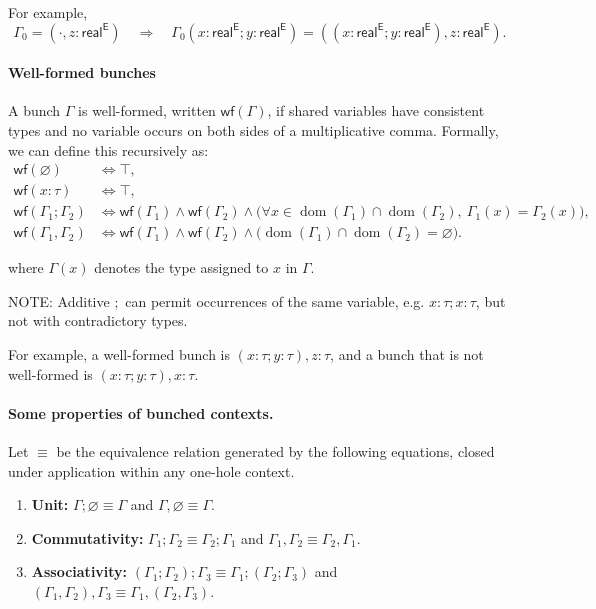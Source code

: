 \documentclass[manuscript,review,nonacm]{acmart}
\newcommand{\E}{\mathsf{E}}
\newcommand{\real}[1]{\mathsf{real}^{#1}}
\newcommand{\wf}{\mathsf{wf}}
\begin{document}
For example,
\[
\Gamma_0=(\cdot,z:\real{\E})
\quad\Longrightarrow\quad
\Gamma_0(x:\real{\E};y:\real{\E})
=((x:\real{\E};y:\real{\E}),z:\real{\E}).
\]

\paragraph{Well-formed bunches}
A bunch $\Gamma$ is well-formed, written $\wf(\Gamma)$, if shared variables have consistent types and no variable occurs on both sides of a multiplicative comma. Formally, we can define this recursively as:
\begin{align*}
\wf(\varnothing) &\iff \top,\\
\wf(x:\tau) &\iff \top,\\
\wf(\Gamma_1;\Gamma_2)
&\iff \wf(\Gamma_1)\land\wf(\Gamma_2) \land
\bigl(
\forall x\in\operatorname{dom}(\Gamma_1)\cap
\operatorname{dom}(\Gamma_2),\
\Gamma_1(x)=\Gamma_2(x)
\bigr),\\
\wf(\Gamma_1,\Gamma_2)
&\iff \wf(\Gamma_1)\land\wf(\Gamma_2) \land
\bigl(
\operatorname{dom}(\Gamma_1)\cap
\operatorname{dom}(\Gamma_2)=\varnothing
\bigr).
\end{align*}

where $\Gamma(x)$ denotes the type assigned to $x$ in $\Gamma$.

NOTE: Additive $;$ can permit occurrences of the same variable, e.g. $x : \tau ; x : \tau$, but not with contradictory types.

For example, a well-formed bunch is $(x:\tau;y:\tau),z:\tau$, and a bunch that is not well-formed is $(x:\tau;y:\tau),x:\tau$.

\paragraph{Some properties of bunched contexts.}
Let $\equiv$ be the equivalence relation generated by the following equations, closed under application within any one-hole context.

\begin{enumerate}
  \item \textbf{Unit:}
  $\Gamma;\varnothing\equiv\Gamma$ and
  $\Gamma,\varnothing\equiv\Gamma$.
  \item \textbf{Commutativity:}
  $\Gamma_1;\Gamma_2\equiv\Gamma_2;\Gamma_1$ and
  $\Gamma_1,\Gamma_2\equiv\Gamma_2,\Gamma_1$.
  \item \textbf{Associativity:}
  $(\Gamma_1;\Gamma_2);\Gamma_3
  \equiv\Gamma_1;(\Gamma_2;\Gamma_3)$ and
  $(\Gamma_1,\Gamma_2),\Gamma_3
  \equiv\Gamma_1,(\Gamma_2,\Gamma_3)$.
\end{enumerate}
\end{document}
